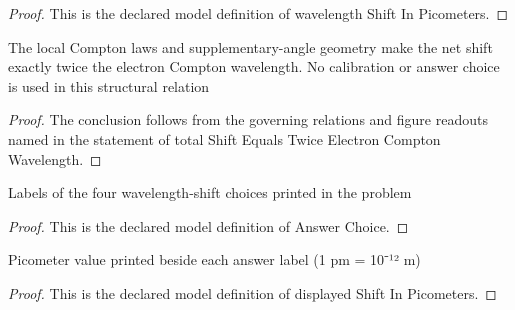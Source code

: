 \begin{proof}
  This is the declared model definition of wavelength Shift In Picometers.
\end{proof}
\begin{lemma}
  \label{lem:physics:phyx-mini-0530:phyxminiproblems-problemphyxmini0530-totalshiftequalstwiceelectroncomptonwavelength}
  The local Compton laws and supplementary-angle geometry make the net shift exactly twice the electron Compton wavelength. No calibration or answer choice is used in this structural relation
\end{lemma}
\begin{proof}
  The conclusion follows from the governing relations and figure readouts named in the statement of total Shift Equals Twice Electron Compton Wavelength.
\end{proof}
\begin{definition}
  \label{def:physics:phyx-mini-0530:phyxminiproblems-problemphyxmini0530-answerchoice}
  Labels of the four wavelength-shift choices printed in the problem
\end{definition}
\begin{proof}
  This is the declared model definition of Answer Choice.
\end{proof}
\begin{definition}
  \label{def:physics:phyx-mini-0530:phyxminiproblems-problemphyxmini0530-displayedshiftinpicometers}
  Picometer value printed beside each answer label (1 pm = 10⁻¹² m)
\end{definition}
\begin{proof}
  This is the declared model definition of displayed Shift In Picometers.
\end{proof}
